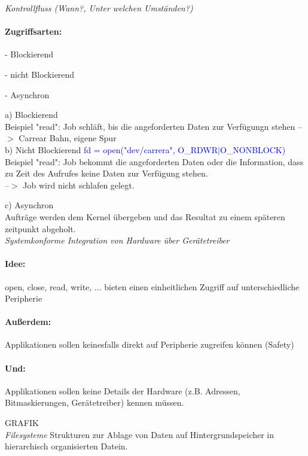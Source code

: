 \documentclass[12pt,a4paper,oneside,ngerman]{article}
\begin{document}
\emph{Kontrollfluss (Wann?, Unter welchen Umständen?)}\\
\paragraph{Zugriffsarten:}
\begin{description}
	\item - Blockierend
	\item - nicht Blockierend
	\item - Asynchron
\end{description}

a) Blockierend\\
Beispiel "read": Job schläft, bis die angeforderten Daten zur Verfügungn stehen --$>$ Carrear Bahn, eigene Spur\\

b) Nicht Blockierend \textcolor{blue}{fd = open("dev/carrera", O\_RDWR$|$O\_NONBLOCK)} \\
Beispiel "read": Job bekommt die angeforderten Daten oder die Information, dass zu Zeit des Aufrufes keine Daten zur Verfügung stehen.\\
--$>$ Job wird nicht schlafen gelegt.

c) Asynchron\\
Aufträge werden dem Kernel übergeben und das Resultat zu einem späteren zeitpunkt abgeholt.\\

\emph{Systemkonforme Integration von Hardware über Gerätetreiber}\\
\paragraph{Idee:}
open, close, read, write, ... bieten einen einheitlichen Zugriff auf unterschiedliche Peripherie
\paragraph{Außerdem:}
Applikationen sollen keinesfalls direkt auf Peripherie zugreifen können (Safety)
\paragraph{Und:}
Applikationen sollen keine Details der Hardware (z.B. Adressen, Bitmaskierungen, Gerätetreiber) kennen müssen.

GRAFIK\\

\emph{Filesysteme}
Strukturen zur Ablage von Daten auf Hintergrundspeicher in hierarchisch organisierten Datein.\\
\end{document}
